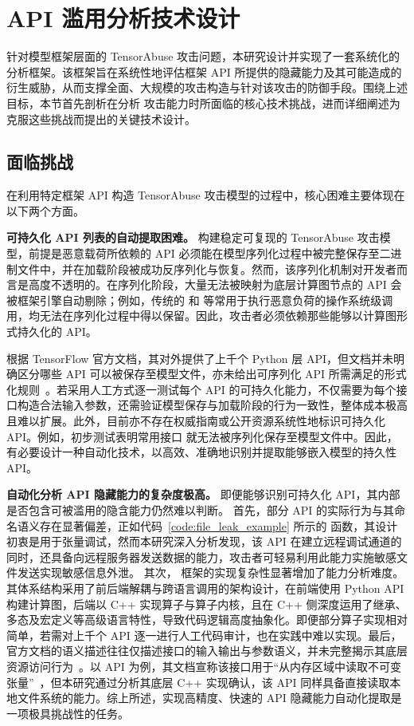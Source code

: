 \section{API 滥用分析技术设计}
针对模型框架层面的 TensorAbuse 攻击问题，本研究设计并实现了一套系统化的分析框架。该框架旨在系统性地评估框架 API 所提供的隐藏能力及其可能造成的衍生威胁，从而支撑全面、大规模的攻击构造与针对该攻击的防御手段。围绕上述目标，本节首先剖析在分析  攻击能力时所面临的核心技术挑战，进而详细阐述为克服这些挑战而提出的关键技术设计。

\subsection{面临挑战}
在利用特定框架 API 构造 TensorAbuse 攻击模型的过程中，核心困难主要体现在以下两个方面。

\textbf{可持久化 API 列表的自动提取困难。}
构建稳定可复现的 TensorAbuse 攻击模型，前提是恶意载荷所依赖的 API 必须能在模型序列化过程中被完整保存至二进制文件中，并在加载阶段被成功反序列化与恢复。然而，该序列化机制对开发者而言是高度不透明的。在序列化阶段，大量无法被映射为底层计算图节点的 API 会被框架引擎自动剔除；例如，传统的  和  等常用于执行恶意负荷的操作系统级调用，均无法在序列化过程中得以保留。因此，攻击者必须依赖那些能够以计算图形式持久化的 API。

根据 TensorFlow 官方文档，其对外提供了上千个 Python 层 API，但文档并未明确区分哪些 API 可以被保存至模型文件，亦未给出可序列化 API 所需满足的形式化规则~\cite{Tensorflowdocs}。若采用人工方式逐一测试每个 API 的可持久化能力，不仅需要为每个接口构造合法输入参数，还需验证模型保存与加载阶段的行为一致性，整体成本极高且难以扩展。此外，目前亦不存在权威指南或公开资源系统性地标识可持久化 API。例如，初步测试表明常用接口  就无法被序列化保存至模型文件中。因此，有必要设计一种自动化技术，以高效、准确地识别并提取能够嵌入模型的持久性 API。


\textbf{自动化分析 API 隐藏能力的复杂度极高。}
即便能够识别可持久化 API，其内部是否包含可被滥用的隐含能力仍然难以判断。
首先，部分 API 的实际行为与其命名语义存在显著偏差，正如代码~\ref{code:file_leak_example} 所示的  函数，其设计初衷是用于张量调试，然而本研究深入分析发现，该 API 在建立远程调试通道的同时，还具备向远程服务器发送数据的能力，攻击者可轻易利用此能力实施敏感文件发送实现敏感信息外泄。
其次， 框架的实现复杂性显著增加了能力分析难度。其体系结构采用了前后端解耦与跨语言调用的架构设计，在前端使用 Python API 构建计算图，后端以 C++ 实现算子与算子内核，且在 C++ 侧深度运用了继承、多态及宏定义等高级语言特性，导致代码逻辑高度抽象化。即便部分算子实现相对简单，若需对上千个 API 逐一进行人工代码审计，也在实践中难以实现。最后，官方文档的语义描述往往仅描述接口的输入输出与参数语义，并未完整揭示其底层资源访问行为~\cite{weimisuseapi2024}。以  API 为例，其文档宣称该接口用于“从内存区域中读取不可变张量”~\cite{tensorflowtfrawopimmutableconst}，但本研究通过分析其底层 C++ 实现确认，该 API 同样具备直接读取本地文件系统的能力。综上所述，实现高精度、快速的 API 隐藏能力自动化提取是一项极具挑战性的任务。

